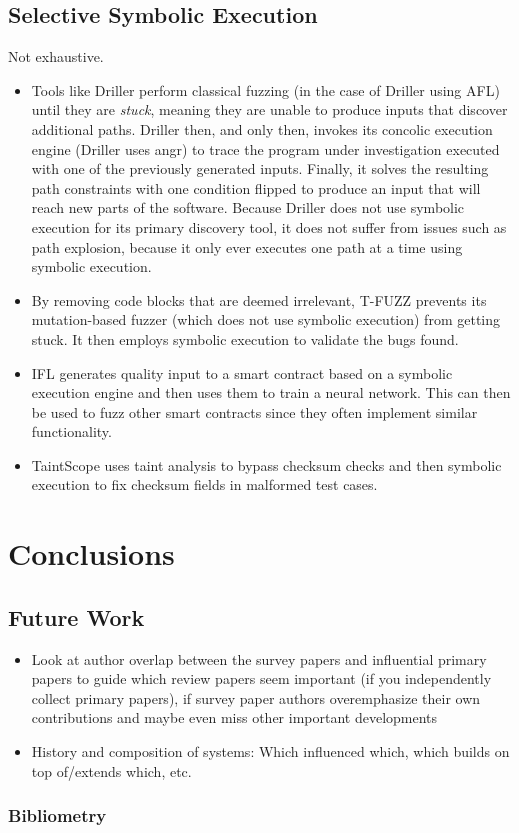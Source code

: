 \documentclass{article}
\begin{document}
\begin{multicols}{2}
    \subsection{Selective Symbolic Execution}
    Not exhaustive.
    \begin{itemize}
        \item Tools like Driller\cite{Driller} perform classical fuzzing (in the case of Driller using AFL\cite{AFLPlusPlus}) until they are \textit{stuck}, meaning they are unable to produce inputs that discover additional paths. Driller then, and only then, invokes its concolic execution engine (Driller uses angr\cite{angr}) to trace the program under investigation executed with one of the previously generated inputs. Finally, it solves the resulting path constraints with one condition flipped to produce an input that will reach new parts of the software. Because Driller does not use symbolic execution for its primary discovery tool, it does not suffer from issues such as path explosion, because it only ever executes one path at a time using symbolic execution.
        \item By removing code blocks that are deemed irrelevant, T-FUZZ\cite{TFuzz} prevents its mutation-based fuzzer (which does not use symbolic execution) from getting stuck. It then employs symbolic execution to validate the bugs found.
        \item IFL\cite{IFL} generates quality input to a smart contract based on a symbolic execution engine and then uses them to train a neural network. This can then be used to fuzz other smart contracts since they often implement similar functionality.
        \item TaintScope\cite{TaintScope} uses taint analysis to bypass checksum checks and then symbolic execution to fix checksum fields in malformed test cases.
    \end{itemize}

    \section{Conclusions}
    \subsection{Future Work}
    \begin{itemize}
        \item Look at author overlap between the survey papers and influential primary papers to guide which review papers seem important (if you independently collect primary papers), if survey paper authors overemphasize their own contributions and maybe even miss other important developments
        \item History and composition of systems: Which influenced which, which builds on top of/extends which, etc.
    \end{itemize}

    \subsubsection{Bibliometry}

    \newpage
    \printbibliography
\end{multicols}
\end{document}
